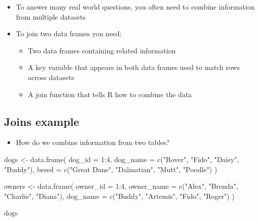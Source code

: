 \documentclass[
  letterpaper,
  DIV=11,
  numbers=noendperiod]{scrartcl}
\newenvironment{Shaded}{\begin{snugshade}}{\end{snugshade}}
\newcommand{\AttributeTok}[1]{\textcolor[rgb]{0.40,0.45,0.13}{#1}}
\newcommand{\DecValTok}[1]{\textcolor[rgb]{0.68,0.00,0.00}{#1}}
\newcommand{\FunctionTok}[1]{\textcolor[rgb]{0.28,0.35,0.67}{#1}}
\newcommand{\NormalTok}[1]{\textcolor[rgb]{0.00,0.23,0.31}{#1}}
\newcommand{\OtherTok}[1]{\textcolor[rgb]{0.00,0.23,0.31}{#1}}
\newcommand{\SpecialCharTok}[1]{\textcolor[rgb]{0.37,0.37,0.37}{#1}}
\newcommand{\StringTok}[1]{\textcolor[rgb]{0.13,0.47,0.30}{#1}}
\providecommand{\tightlist}{%
  \setlength{\itemsep}{0pt}\setlength{\parskip}{0pt}}
\begin{document}
\begin{itemize}
\tightlist
\item
  To answer many real world questions, you often need to combine
  information from multiple datasets
\item
  To join two data frames you need:

  \begin{itemize}
  \tightlist
  \item
    Two data frames containing related information
  \item
    A key variable that appears in both data frames used to match rows
    across datasets
  \item
    A join function that tells R how to combine the data
  \end{itemize}
\end{itemize}

\subsection{Joins example}\label{joins-example}

\begin{itemize}
\tightlist
\item
  How do we combine information from two tables?
\end{itemize}

\begin{Shaded}
\begin{Highlighting}[]
\NormalTok{dogs }\OtherTok{\textless{}{-}} \FunctionTok{data.frame}\NormalTok{(}
  \AttributeTok{dog\_id =} \DecValTok{1}\SpecialCharTok{:}\DecValTok{4}\NormalTok{,}
  \AttributeTok{dog\_name =} \FunctionTok{c}\NormalTok{(}\StringTok{"Rover"}\NormalTok{, }\StringTok{"Fido"}\NormalTok{, }\StringTok{"Daisy"}\NormalTok{, }\StringTok{"Buddy"}\NormalTok{),}
  \AttributeTok{breed =} \FunctionTok{c}\NormalTok{(}\StringTok{"Great Dane"}\NormalTok{, }\StringTok{"Dalmatian"}\NormalTok{, }\StringTok{"Mutt"}\NormalTok{, }\StringTok{"Poodle"}\NormalTok{)}
\NormalTok{)}

\NormalTok{owners }\OtherTok{\textless{}{-}} \FunctionTok{data.frame}\NormalTok{(}
  \AttributeTok{owner\_id =} \DecValTok{1}\SpecialCharTok{:}\DecValTok{4}\NormalTok{,}
  \AttributeTok{owner\_name =} \FunctionTok{c}\NormalTok{(}\StringTok{"Alex"}\NormalTok{, }\StringTok{"Brenda"}\NormalTok{, }\StringTok{"Charlie"}\NormalTok{, }\StringTok{"Diana"}\NormalTok{),}
  \AttributeTok{dog\_name =} \FunctionTok{c}\NormalTok{(}\StringTok{"Buddy"}\NormalTok{, }\StringTok{"Artemis"}\NormalTok{, }\StringTok{"Fido"}\NormalTok{, }\StringTok{"Roger"}\NormalTok{)}
\NormalTok{)}

\NormalTok{dogs}
\end{Highlighting}
\end{Shaded}
\end{document}
